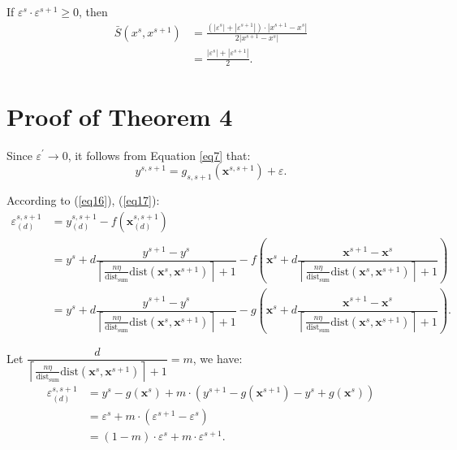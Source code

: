 \documentclass[final,3p,times]{elsarticle}
\begin{document}
If $\varepsilon^s\cdot\varepsilon^{s+1}\ge0$, then
\begin{equation*}
\begin{aligned}
\bar{S}(x^s,x^{s+1})
&=\frac{(|\varepsilon^s|+|\varepsilon^{s+1}|)\cdot|x^
{s+1}-x^{s}|}{2|x^{s+1}-x^{s}|}\\
&=\frac{|\varepsilon^s|+|\varepsilon^{s+1}|}{2}.
\end{aligned}
\end{equation*}

\section{Proof of Theorem 4}
Since $\varepsilon^\prime\rightarrow0$, it follows from 
Equation \ref{eq7} that:
\begin{equation*}
y^{s,s+1}=g_{s,s+1}(\boldsymbol{x}^{s,s+1})+\varepsilon.
\end{equation*}

According to (\ref{eq16}), (\ref{eq17}):
\begin{equation*}
\begin{aligned}
\varepsilon^{s,s+1}_{(d)}
&=y_{(d)}^{s,s+1}-f(\boldsymbol{x}_{(d)}^{s,s+1})\\
&=y^s+d\dfrac{y^{s+1}-y^{s}}{\left\lceil \frac{n\eta}
{\text{dist}_{\text{sum}}}\text{dist}(\boldsymbol{x}^s,
\boldsymbol{x}^{s+1})\right\rceil+1}-f{(\boldsymbol{x}^s+
d\dfrac{\boldsymbol{x}^{s+1}-\boldsymbol{x}^{s}}
{\left\lceil \frac{n\eta}{\text{dist}_{\text{sum}}}
\text{dist}(\boldsymbol{x}^s,\boldsymbol{x}^{s+1})
\right\rceil+1})}\\
&=y^s+d\dfrac{y^{s+1}-y^{s}}{\left\lceil \frac{n\eta}
{\text{dist}_{\text{sum}}}\text{dist}(\boldsymbol{x}^s,
\boldsymbol{x}^{s+1})\right\rceil+1}-g{(\boldsymbol{x}^s+
d\dfrac{\boldsymbol{x}^{s+1}-\boldsymbol{x}^{s}}{\left
\lceil \frac{n\eta}{\text{dist}_{\text{sum}}}\text{dist}
(\boldsymbol{x}^s,\boldsymbol{x}^{s+1})\right\rceil+1})}.
\end{aligned}
\end{equation*}

Let $\dfrac{d}{\left\lceil \frac{n\eta}{\text{dist}_
{\text{sum}}}\text{dist}(\boldsymbol{x}^s,\boldsymbol{x}^
{s+1})\right\rceil+1}=m$, we have:
\begin{equation*}
\begin{aligned}
\varepsilon^{s,s+1}_{(d)}
&=y^s-g(\boldsymbol{x}^s)+m\cdot(y^{s+1}-g(\boldsymbol
{x}^{s+1})-y^s+g(\boldsymbol{x}^{s}))\\
&=\varepsilon^s+m\cdot(\varepsilon^{s+1}-\varepsilon^s)\\
&=(1-m)\cdot\varepsilon^s+m\cdot\varepsilon^{s+1}.
\end{aligned}
\end{equation*}
\end{document}
